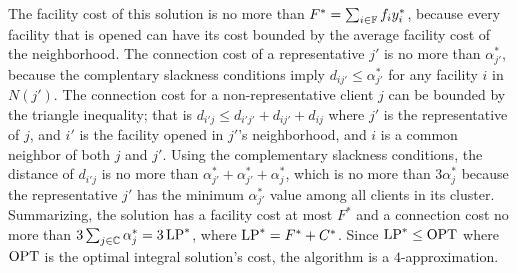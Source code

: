 \documentclass[oneside,final]{ucr}
\begin{document}
The facility cost of this solution is no more than $F^\ast =
\sum_{i\in\mathbb{F}} f_i y_i^\ast$, because every facility
that is opened can have its cost bounded by the average
facility cost of the neighborhood. The connection cost of a
representative $j'$ is no more than $\alpha_{j'}^\ast$,
because the complentary slackness conditions imply $d_{ij'}
\leq \alpha_{j'}^\ast$ for any facility $i$ in $N(j')$. The
connection cost for a non-representative client $j$ can be
bounded by the triangle inequality; that is $d_{i'j} \leq
d_{i'j'} + d_{ij'} + d_{ij}$ where $j'$ is the
representative of $j$, and $i'$ is the facility opened in
$j'$'s neighborhood, and $i$ is a common neighbor of both
$j$ and $j'$. Using the complementary slackness conditions,
the distance of $d_{i'j}$ is no more than $\alpha_{j'}^\ast
+ \alpha_{j'}^\ast + \alpha_j^\ast$, which is no more than
$3\alpha_j^\ast$ because the representative $j'$ has the
minimum $\alpha_{j'}^\ast$ value among all clients in its
cluster. Summarizing, the solution has a facility cost at
most $F^\ast$ and a connection cost no more than
$3\sum_{j\in\mathbb{C}} \alpha_j^\ast = 3\,\mbox{\rm LP}^\ast$, where
$\mbox{\rm LP}^\ast = F^\ast + C^\ast$. Since $\mbox{\rm LP}^\ast \leq \mbox{\rm OPT}$
where $\mbox{\rm OPT}$ is the optimal integral solution's cost, the
algorithm is a $4$-approximation.
%
%
\end{document}

